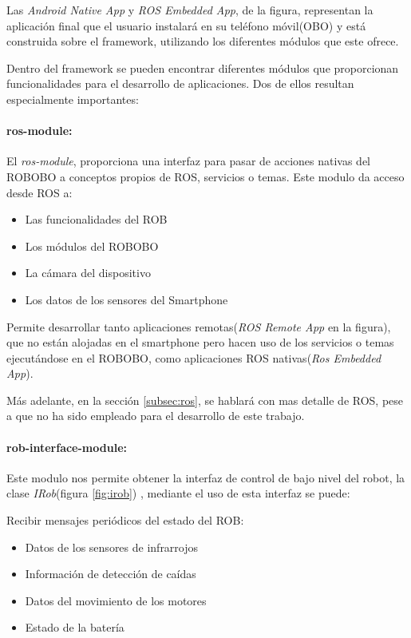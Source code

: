 Las \textit{Android Native App} y \textit{ROS Embedded App}, de la figura, representan la aplicación final que el usuario instalará en su teléfono móvil(OBO) y está construida sobre el framework, utilizando los diferentes módulos que este ofrece.


Dentro del framework se pueden encontrar diferentes módulos que proporcionan funcionalidades para el desarrollo de aplicaciones. Dos de ellos resultan especialmente importantes:

\paragraph*{ros-module:\\}
	 El \textit{ros-module}, proporciona una interfaz para pasar de acciones nativas del ROBOBO a conceptos propios de ROS, servicios o temas. Este modulo da acceso desde ROS a: 
	\begin{itemize}
		\item Las funcionalidades del ROB
		\item Los módulos del ROBOBO
		\item La cámara del dispositivo
		\item Los datos de los sensores del Smartphone
	\end{itemize} 
	Permite desarrollar tanto aplicaciones remotas(\textit{ROS Remote App} en la figura), que no están alojadas en el smartphone pero  hacen uso de los servicios o temas ejecutándose en el ROBOBO, como aplicaciones ROS nativas(\textit{Ros Embedded App}).
	
Más adelante, en la sección \ref{subsec:ros}, se hablará con mas detalle de ROS, pese a que no ha sido empleado para el desarrollo de este trabajo.

\paragraph*{rob-interface-module:\\}
Este modulo nos permite obtener la interfaz de control de bajo nivel del robot, la clase \textit{IRob}(figura \ref{fig:irob}) , mediante el uso de esta interfaz se puede:

Recibir mensajes periódicos del estado del ROB:
\begin{itemize}
	\item Datos de los sensores de infrarrojos
	\item Información de detección de caídas
	\item Datos del movimiento de los motores
	\item Estado de la batería
\end{itemize}

